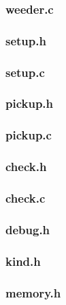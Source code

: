 \documentclass[a4paper,10pt,titlepage]{report}
\begin{document}
\subsubsection{weeder.c}


\subsubsection{setup.h}


\subsubsection{setup.c}


\subsubsection{pickup.h}


\subsubsection{pickup.c}


\subsubsection{check.h}


\subsubsection{check.c}


\subsubsection{debug.h}


\subsubsection{kind.h}


\subsubsection{memory.h}

\end{document}
